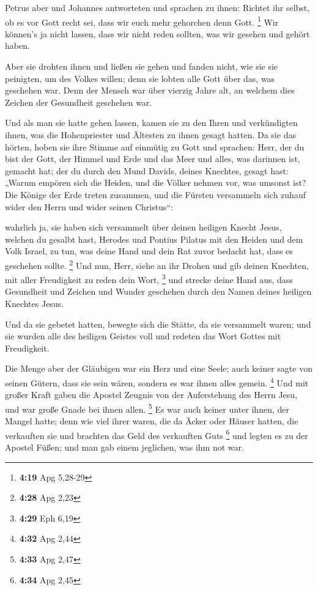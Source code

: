  Petrus aber und Johannes antworteten und sprachen zu
ihnen: Richtet ihr selbst, ob es vor Gott recht sei, dass wir euch mehr
gehorchen denn Gott. \footnote{\textbf{4:19} Apg 5,28-29}
 Wir können's ja nicht lassen, dass wir nicht reden
sollten, was wir gesehen und gehört haben.

 Aber sie drohten ihnen und ließen sie gehen und fanden
nicht, wie sie sie peinigten, um des Volkes willen; denn sie lobten alle
Gott über das, was geschehen war.  Denn der Mensch war
über vierzig Jahre alt, an welchem dies Zeichen der Gesundheit geschehen
war.

 Und als man sie hatte gehen lassen, kamen sie zu den
Ihren und verkündigten ihnen, was die Hohenpriester und Ältesten zu
ihnen gesagt hatten.  Da sie das hörten, hoben sie ihre
Stimme auf einmütig zu Gott und sprachen: Herr, der du bist der Gott,
der Himmel und Erde und das Meer und alles, was darinnen ist, gemacht
hat;  der du durch den Mund Davids, deines Knechtes,
gesagt hast: „Warum empören sich die Heiden, und die Völker nehmen vor,
was umsonst ist?  Die Könige der Erde treten zusammen,
und die Fürsten versammeln sich zuhauf wider den Herrn und wider seinen
Christus``:

 wahrlich ja, sie haben sich versammelt über deinen
heiligen Knecht Jesus, welchen du gesalbt hast, Herodes und Pontius
Pilatus mit den Heiden und dem Volk Israel,  zu tun, was
deine Hand und dein Rat zuvor bedacht hat, dass es geschehen sollte.
\footnote{\textbf{4:28} Apg 2,23}  Und nun, Herr, siehe
an ihr Drohen und gib deinen Knechten, mit aller Freudigkeit zu reden
dein Wort, \footnote{\textbf{4:29} Eph 6,19}  und strecke
deine Hand aus, dass Gesundheit und Zeichen und Wunder geschehen durch
den Namen deines heiligen Knechtes Jesus.

 Und da sie gebetet hatten, bewegte sich die Stätte, da
sie versammelt waren; und sie wurden alle des heiligen Geistes voll und
redeten das Wort Gottes mit Freudigkeit.

 Die Menge aber der Gläubigen war ein Herz und eine
Seele; auch keiner sagte von seinen Gütern, dass sie sein wären, sondern
es war ihnen alles gemein. \footnote{\textbf{4:32} Apg 2,44}
 Und mit großer Kraft gaben die Apostel Zeugnis von der
Auferstehung des Herrn Jesu, und war große Gnade bei ihnen allen.
\footnote{\textbf{4:33} Apg 2,47}  Es war auch keiner
unter ihnen, der Mangel hatte; denn wie viel ihrer waren, die da Äcker
oder Häuser hatten, die verkauften sie und brachten das Geld des
verkauften Guts \footnote{\textbf{4:34} Apg 2,45}  und
legten es zu der Apostel Füßen; und man gab einem jeglichen, was ihm not
war.

